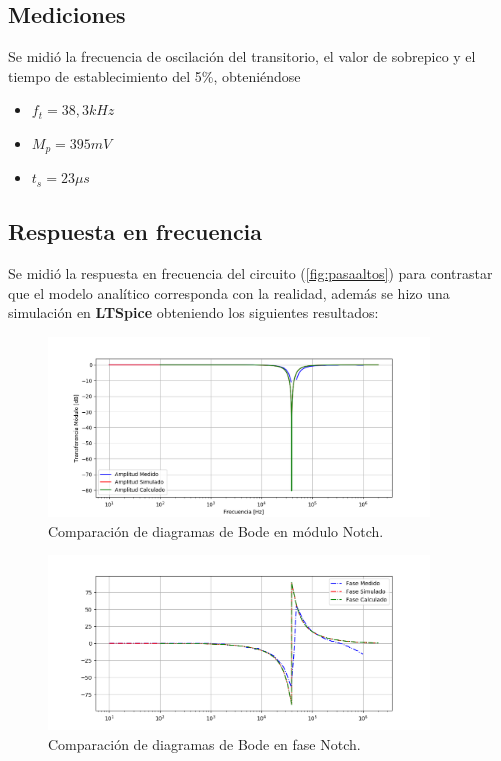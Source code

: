 \subsection{Mediciones}
Se midió la frecuencia de oscilación del transitorio, el valor de sobrepico y el tiempo de establecimiento del 5\%, obteniéndose
\begin{itemize}
    \item $f_t=38,3 kHz$
    \item $M_p=395 mV$
    \item $t_s=23 \mu s$
\end{itemize}

\subsection{Respuesta en frecuencia}
Se midió la respuesta en frecuencia del circuito (\ref{fig:pasaaltos}) para contrastar que el modelo analítico corresponda con la realidad, además se hizo una simulación en \textbf{LTSpice} obteniendo los siguientes resultados:
\begin{figure}[H]
	\centering
	\includegraphics[width=0.9\textwidth]{Bodes_Labo/Fotos/BR.png}
\caption{Comparación de diagramas de Bode en módulo Notch.}
	\label{fig:BODEBR}
\end{figure}

\begin{figure}[H]
	\centering
	\includegraphics[width=0.9\textwidth]{Bodes_Labo/Fotos/BRP.png}
\caption{Comparación de diagramas de Bode en fase Notch.}
	\label{fig:BODEBRP}
\end{figure}
